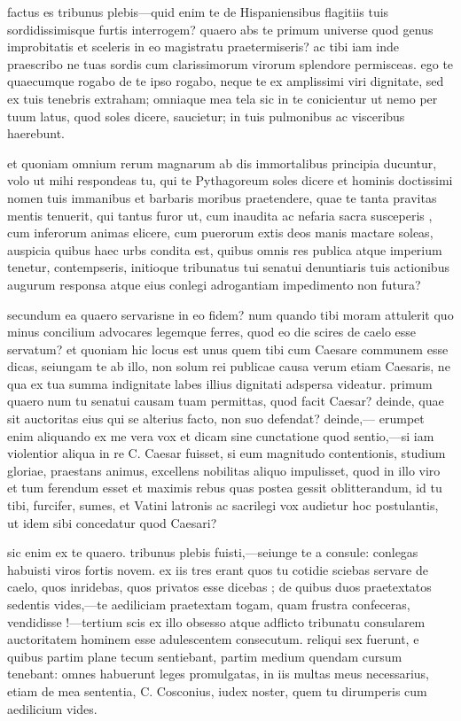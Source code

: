  factus es tribunus plebis—quid enim te de Hispaniensibus flagitiis tuis sordidissimisque furtis interrogem? quaero abs te primum universe quod genus improbitatis et sceleris in eo magistratu praetermiseris? ac tibi iam inde praescribo ne tuas sordis cum clarissimorum virorum splendore permisceas. ego te quaecumque rogabo de te ipso rogabo, neque te ex amplissimi viri dignitate, sed ex tuis tenebris extraham; omniaque mea tela sic in te conicientur ut nemo per tuum latus, quod soles dicere, saucietur; in tuis pulmonibus ac visceribus haerebunt.

 et quoniam omnium rerum magnarum ab dis immortalibus principia ducuntur, volo ut mihi respondeas tu, qui te Pythagoreum soles dicere et hominis doctissimi nomen tuis immanibus et barbaris moribus praetendere, quae te tanta pravitas mentis tenuerit, qui tantus furor ut, cum inaudita ac nefaria sacra susceperis , cum inferorum animas elicere, cum puerorum extis deos manis mactare soleas, auspicia quibus haec urbs condita est, quibus omnis res publica atque imperium tenetur, contempseris, initioque tribunatus tui senatui denuntiaris tuis actionibus augurum responsa atque eius conlegi adrogantiam impedimento non futura?

 secundum ea quaero servarisne in eo fidem? num quando tibi moram attulerit quo minus concilium advocares legemque ferres, quod eo die scires de caelo esse servatum? et quoniam hic locus est unus quem tibi cum Caesare communem esse dicas, seiungam te ab illo, non solum rei publicae causa verum etiam Caesaris, ne qua ex tua summa indignitate labes illius dignitati adspersa videatur. primum quaero num tu senatui causam tuam permittas, quod facit Caesar? deinde, quae sit auctoritas eius qui se alterius facto, non suo defendat? deinde,— erumpet enim aliquando ex me vera vox et dicam sine cunctatione quod sentio,—si iam violentior aliqua in re C. Caesar fuisset, si eum magnitudo contentionis, studium gloriae, praestans animus, excellens nobilitas aliquo impulisset, quod in illo viro et tum ferendum esset et maximis rebus quas postea gessit oblitterandum, id tu tibi, furcifer, sumes, et Vatini latronis ac sacrilegi vox audietur hoc postulantis, ut idem sibi concedatur quod Caesari?

 sic enim ex te quaero. tribunus plebis fuisti,—seiunge te a consule: conlegas habuisti viros fortis novem. ex iis tres erant quos tu cotidie sciebas servare de caelo, quos inridebas, quos privatos esse dicebas ; de quibus duos praetextatos sedentis vides,—te aediliciam praetextam togam, quam frustra confeceras, vendidisse !—tertium scis ex illo obsesso atque adflicto tribunatu consularem auctoritatem hominem esse adulescentem consecutum. reliqui sex fuerunt, e quibus partim plane tecum sentiebant, partim medium quendam cursum tenebant: omnes habuerunt leges promulgatas, in iis multas meus necessarius, etiam de mea sententia, C. Cosconius, iudex noster, quem tu dirumperis cum aedilicium vides.

